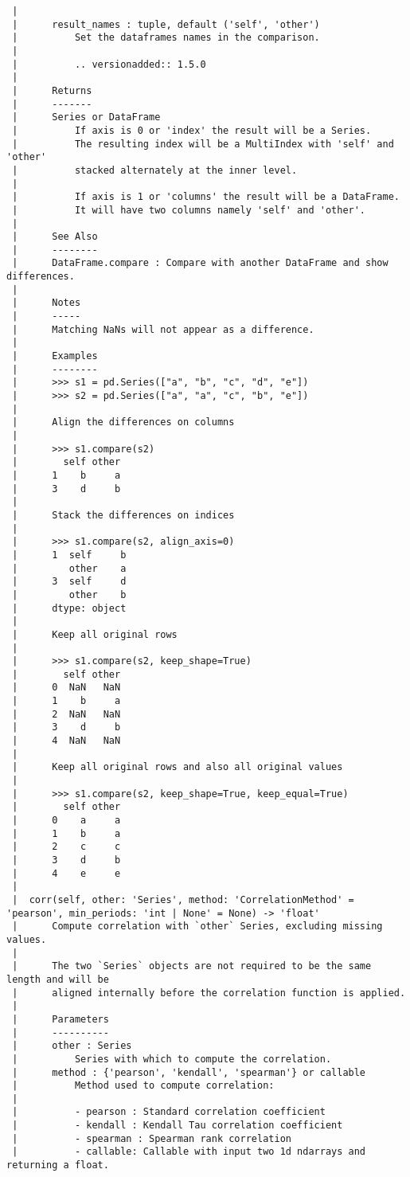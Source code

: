 \documentclass[
  letterpaper,
  DIV=11,
  numbers=noendperiod]{scrreprt}
\begin{document}
\begin{verbatim}
 |      
 |      result_names : tuple, default ('self', 'other')
 |          Set the dataframes names in the comparison.
 |      
 |          .. versionadded:: 1.5.0
 |      
 |      Returns
 |      -------
 |      Series or DataFrame
 |          If axis is 0 or 'index' the result will be a Series.
 |          The resulting index will be a MultiIndex with 'self' and 'other'
 |          stacked alternately at the inner level.
 |      
 |          If axis is 1 or 'columns' the result will be a DataFrame.
 |          It will have two columns namely 'self' and 'other'.
 |      
 |      See Also
 |      --------
 |      DataFrame.compare : Compare with another DataFrame and show differences.
 |      
 |      Notes
 |      -----
 |      Matching NaNs will not appear as a difference.
 |      
 |      Examples
 |      --------
 |      >>> s1 = pd.Series(["a", "b", "c", "d", "e"])
 |      >>> s2 = pd.Series(["a", "a", "c", "b", "e"])
 |      
 |      Align the differences on columns
 |      
 |      >>> s1.compare(s2)
 |        self other
 |      1    b     a
 |      3    d     b
 |      
 |      Stack the differences on indices
 |      
 |      >>> s1.compare(s2, align_axis=0)
 |      1  self     b
 |         other    a
 |      3  self     d
 |         other    b
 |      dtype: object
 |      
 |      Keep all original rows
 |      
 |      >>> s1.compare(s2, keep_shape=True)
 |        self other
 |      0  NaN   NaN
 |      1    b     a
 |      2  NaN   NaN
 |      3    d     b
 |      4  NaN   NaN
 |      
 |      Keep all original rows and also all original values
 |      
 |      >>> s1.compare(s2, keep_shape=True, keep_equal=True)
 |        self other
 |      0    a     a
 |      1    b     a
 |      2    c     c
 |      3    d     b
 |      4    e     e
 |  
 |  corr(self, other: 'Series', method: 'CorrelationMethod' = 'pearson', min_periods: 'int | None' = None) -> 'float'
 |      Compute correlation with `other` Series, excluding missing values.
 |      
 |      The two `Series` objects are not required to be the same length and will be
 |      aligned internally before the correlation function is applied.
 |      
 |      Parameters
 |      ----------
 |      other : Series
 |          Series with which to compute the correlation.
 |      method : {'pearson', 'kendall', 'spearman'} or callable
 |          Method used to compute correlation:
 |      
 |          - pearson : Standard correlation coefficient
 |          - kendall : Kendall Tau correlation coefficient
 |          - spearman : Spearman rank correlation
 |          - callable: Callable with input two 1d ndarrays and returning a float.

\end{verbatim}
\end{document}
